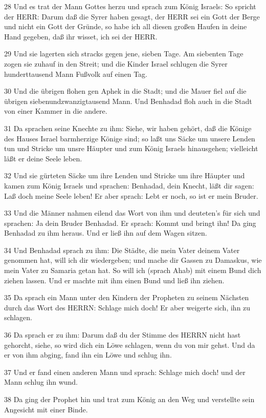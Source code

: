 \par 28 Und es trat der Mann Gottes herzu und sprach zum König Israels: So spricht der HERR: Darum daß die Syrer haben gesagt, der HERR sei ein Gott der Berge und nicht ein Gott der Gründe, so habe ich all diesen großen Haufen in deine Hand gegeben, daß ihr wisset, ich sei der HERR.
\par 29 Und sie lagerten sich stracks gegen jene, sieben Tage. Am siebenten Tage zogen sie zuhauf in den Streit; und die Kinder Israel schlugen die Syrer hunderttausend Mann Fußvolk auf einen Tag.
\par 30 Und die übrigen flohen gen Aphek in die Stadt; und die Mauer fiel auf die übrigen siebenundzwanzigtausend Mann. Und Benhadad floh auch in die Stadt von einer Kammer in die andere.
\par 31 Da sprachen seine Knechte zu ihm: Siehe, wir haben gehört, daß die Könige des Hauses Israel barmherzige Könige sind; so laßt uns Säcke um unsere Lenden tun und Stricke um unsre Häupter und zum König Israels hinausgehen; vielleicht läßt er deine Seele leben.
\par 32 Und sie gürteten Säcke um ihre Lenden und Stricke um ihre Häupter und kamen zum König Israels und sprachen: Benhadad, dein Knecht, läßt dir sagen: Laß doch meine Seele leben! Er aber sprach: Lebt er noch, so ist er mein Bruder.
\par 33 Und die Männer nahmen eilend das Wort von ihm und deuteten's für sich und sprachen: Ja dein Bruder Benhadad. Er sprach: Kommt und bringt ihn! Da ging Benhadad zu ihm heraus. Und er ließ ihn auf dem Wagen sitzen.
\par 34 Und Benhadad sprach zu ihm: Die Städte, die mein Vater deinem Vater genommen hat, will ich dir wiedergeben; und mache dir Gassen zu Damaskus, wie mein Vater zu Samaria getan hat. So will ich (sprach Ahab) mit einem Bund dich ziehen lassen. Und er machte mit ihm einen Bund und ließ ihn ziehen.
\par 35 Da sprach ein Mann unter den Kindern der Propheten zu seinem Nächsten durch das Wort des HERRN: Schlage mich doch! Er aber weigerte sich, ihn zu schlagen.
\par 36 Da sprach er zu ihm: Darum daß du der Stimme des HERRN nicht hast gehorcht, siehe, so wird dich ein Löwe schlagen, wenn du von mir gehst. Und da er von ihm abging, fand ihn ein Löwe und schlug ihn.
\par 37 Und er fand einen anderen Mann und sprach: Schlage mich doch! und der Mann schlug ihn wund.
\par 38 Da ging der Prophet hin und trat zum König an den Weg und verstellte sein Angesicht mit einer Binde.
